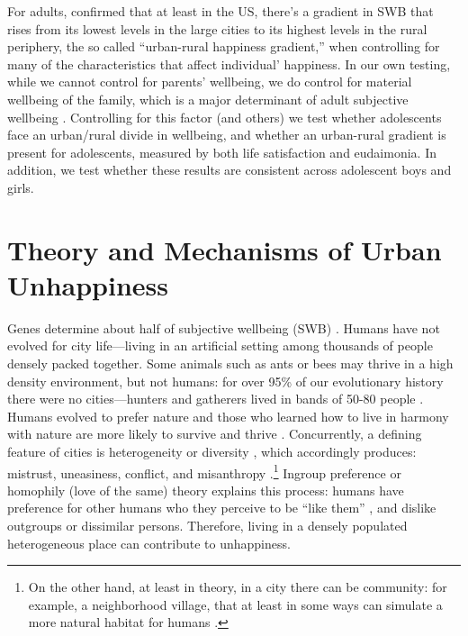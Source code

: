 \documentclass[10pt, letterpaper]{article}
\begin{document}
\begin{spacing}{1.4}
For adults,  \citet{aok11a} confirmed that at least in the
US, there's a gradient in SWB that rises from its lowest levels in the large
cities to its highest levels in the rural periphery, the so called ``urban-rural
happiness gradient,'' when controlling for many of the characteristics that
affect individual' happiness. In our own testing, while we cannot control for
parents' wellbeing, we do control for material wellbeing of the family, which is
a major determinant of adult subjective wellbeing \citep{clark2018}. Controlling for
this factor (and others) we test whether adolescents face an urban/rural divide
in wellbeing, and whether an urban-rural gradient is present for adolescents,
measured by both life satisfaction and eudaimonia. In addition, we test whether
these results are consistent across adolescent boys and girls.




\section*{Theory and Mechanisms of Urban Unhappiness}

 Genes determine about half of subjective wellbeing (SWB)
 \citep{schnittker08,lykken96t,brooksGenetic}.
 Humans have not
evolved for city life---living in an artificial setting among thousands of people densely packed together. Some animals such as ants or bees may thrive in a high density environment, but not humans: for over 95\% of our evolutionary history there were no cities---hunters and
gatherers lived in bands of 50-80 people \citep{maryanski92}. Humans evolved to
prefer nature and those who learned how to live in harmony with nature are more
likely to survive and thrive \citep{pretty12,yamamoto16}. 
Concurrently, a defining feature of cities is heterogeneity or diversity \citep{wirth38}, which accordingly produces: 
 mistrust, uneasiness, conflict, and misanthropy
 \citep{milgram70,thrift05,amin06,aok22}.\footnote{On the other hand, at least in theory, in a city there can be community: for example, a neighborhood village, that at least in some ways can simulate a more natural habitat for humans \citep{fischer95,fischer75,jacobs93}.}
Ingroup preference or homophily (love of the same) theory explains this process: humans have preference for other humans who they perceive to be ``like them'' \citep{mcpherson01,tajfel82,tajfel71,smelser99,putnam07,christakis09f}, and dislike outgroups or dissimilar persons. Therefore, living in a densely populated heterogeneous place can contribute to unhappiness.



\end{spacing}
\end{document}
